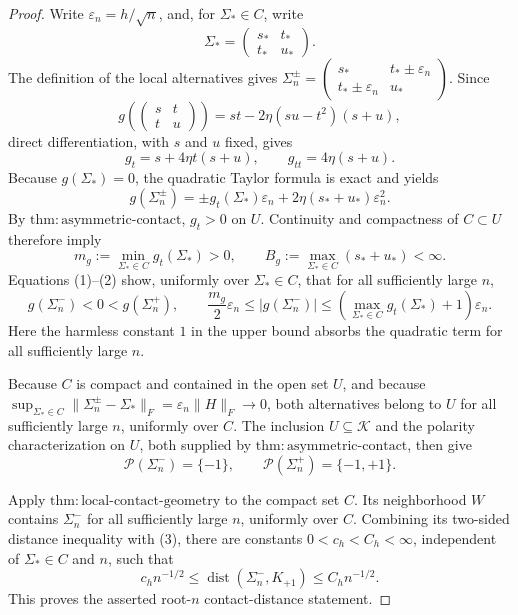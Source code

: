 \documentclass{article}
\begin{document}
\begin{proof}
Write \(\varepsilon_n=h/\sqrt n\), and, for \(\Sigma_*\in C\), write
\[
 \Sigma_*=\begin{pmatrix}s_*&t_*\\t_*&u_*\end{pmatrix}.
\]
The definition of the local alternatives gives
\(\Sigma_n^\pm=\begin{pmatrix}s_*&t_*\pm\varepsilon_n\\t_*\pm\varepsilon_n&u_*\end{pmatrix}\).  Since
\[
 g\!\left(\begin{pmatrix}s&t\\t&u\end{pmatrix}\right)
 =st-2\eta(su-t^2)(s+u),
\]
direct differentiation, with \(s\) and \(u\) fixed, gives
\[
 g_t=s+4\eta t(s+u),\qquad g_{tt}=4\eta(s+u).
\]
Because \(g(\Sigma_*)=0\), the quadratic Taylor formula is exact and yields
\[
 g(\Sigma_n^\pm)
 =\pm g_t(\Sigma_*)\varepsilon_n
   +2\eta(s_*+u_*)\varepsilon_n^2. \tag{1}
\]
By \(\mathrm{thm:asymmetric\text{-}contact}\), \(g_t>0\) on \(U\).  Continuity and compactness of \(C\subset U\) therefore imply
\[
 m_g:=\min_{\Sigma_*\in C}g_t(\Sigma_*)>0,
 \qquad
 B_g:=\max_{\Sigma_*\in C}(s_*+u_*)<\infty. \tag{2}
\]
Equations (1)--(2) show, uniformly over \(\Sigma_*\in C\), that for all sufficiently large \(n\),
\[
 g(\Sigma_n^-)<0<g(\Sigma_n^+),
 \qquad
 \frac{m_g}{2}\varepsilon_n
 \le |g(\Sigma_n^-)|
 \le
 \left(\max_{\Sigma_*\in C}g_t(\Sigma_*)+1\right)\varepsilon_n. \tag{3}
\]
Here the harmless constant \(1\) in the upper bound absorbs the quadratic term for all sufficiently large \(n\).

Because \(C\) is compact and contained in the open set \(U\), and because
\(\sup_{\Sigma_*\in C}\|\Sigma_n^\pm-\Sigma_*\|_F
=\varepsilon_n\|H\|_F\to0\), both alternatives belong to \(U\) for all sufficiently large \(n\), uniformly over \(C\).  The inclusion \(U\subseteq\mathcal K\) and the polarity characterization on \(U\), both supplied by \(\mathrm{thm:asymmetric\text{-}contact}\), then give
\[
 \mathcal P(\Sigma_n^-)=\{-1\},
 \qquad
 \mathcal P(\Sigma_n^+)=\{-1,+1\}. \tag{4}
\]

Apply \(\mathrm{thm:local\text{-}contact\text{-}geometry}\) to the compact set \(C\).  Its neighborhood \(W\) contains \(\Sigma_n^-\) for all sufficiently large \(n\), uniformly over \(C\).  Combining its two-sided distance inequality with (3), there are constants \(0<c_h<C_h<\infty\), independent of \(\Sigma_*\in C\) and \(n\), such that
\[
 c_h n^{-1/2}
 \le \operatorname{dist}(\Sigma_n^-,K_{+1})
 \le C_h n^{-1/2}. \tag{5}
\]
This proves the asserted root-\(n\) contact-distance statement.


\end{proof}
\end{document}
